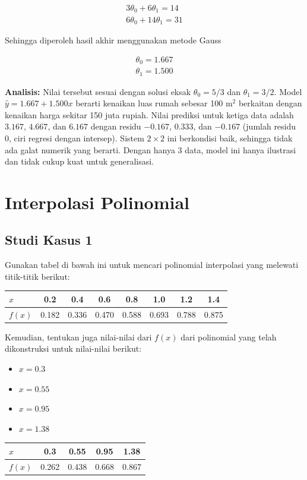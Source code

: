 \documentclass[12pt,a4paper]{report}
\begin{document}
\begin{align*}
3\theta_0 + 6 \theta_1 = 14 \\
6\theta_0 + 14\theta_1 = 31
\end{align*}

Sehingga diperoleh hasil akhir menggunakan metode Gauss

\begin{align*}
\theta_0 = 1.667 \\
\theta_1 = 1.500
\end{align*}

\textbf{Analisis:} Nilai tersebut sesuai dengan solusi eksak $\theta_0=5/3$ dan $\theta_1=3/2$. Model $\hat{y}=1.667+1.500x$ berarti kenaikan luas rumah sebesar 100 m$^2$ berkaitan dengan kenaikan harga sekitar 150 juta rupiah. Nilai prediksi untuk ketiga data adalah $3.167$, $4.667$, dan $6.167$ dengan residu $-0.167$, $0.333$, dan $-0.167$ (jumlah residu 0, ciri regresi dengan intersep). Sistem $2\times2$ ini berkondisi baik, sehingga tidak ada galat numerik yang berarti. Dengan hanya 3 data, model ini hanya ilustrasi dan tidak cukup kuat untuk generalisasi.

\section{Interpolasi Polinomial}

\subsection{Studi Kasus 1}

Gunakan tabel di bawah ini untuk mencari polinomial interpolasi yang melewati titik-titik berikut:

\begin{center}
\begin{tabular}{|l|ccccccc|}
    \hline
    $x$    & 0.2   & 0.4   & 0.6   & 0.8   & 1.0   & 1.2   & 1.4   \\
    \hline
    $f(x)$ & 0.182 & 0.336 & 0.470 & 0.588 & 0.693 & 0.788 & 0.875 \\
    \hline
\end{tabular}
\end{center}

Kemudian, tentukan juga nilai-nilai dari $f(x)$ dari polinomial yang telah dikonstruksi untuk nilai-nilai berikut:

\begin{itemize}
    \item $x = 0.3$
    \item $x = 0.55$
    \item $x = 0.95$
    \item $x = 1.38$
\end{itemize}
\begin{center}
\begin{tabular}{|l|cccc|}
    \hline
    $x$    & 0.3  & 0.55   & 0.95   & 1.38   \\
    \hline
    $f(x)$ & 0.262 & 0.438 & 0.668 & 0.867 \\
    \hline
\end{tabular}
\end{center}
\end{document}
